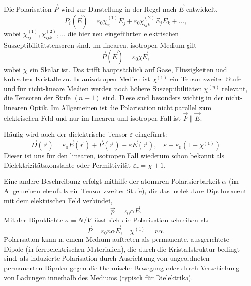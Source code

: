 Die Polarisation $\vec {P}$ wird zur Darstellung in der Regel nach $\vec {E}$ entwickelt,
\begin{equation*}
	P_{i}\left(\vec {E}\right)=\varepsilon _{0}\chi _{ij}^{\left(1\right)}E_{j}+\varepsilon _{0}\chi _{ijk}^{\left(2\right)}E_{j}E_{k}+\ldots ,
\end{equation*}
wobei $\chi _{ij}^{\left(1\right)}, \chi _{ijk}^{\left(2\right)},\ldots $ die hier neu eingeführten elektrischen Suszeptibilitätstensoren sind. Im linearen, isotropen Medium gilt
\begin{equation*}
	\vec {P}\left(\vec {E}\right)=\varepsilon _{0}\chi \vec {E},
\end{equation*}
wobei $\chi $ ein Skalar ist. Das trifft hauptsächlich auf Gase, Flüssigkeiten und kubischen Kristalle zu. In anisotropen Medien ist $\chi ^{\left(1\right)}$ ein Tensor zweiter Stufe und für nicht-lineare Medien werden noch höhere Suszeptibilitäten $\chi ^{\left(n\right)}$ relevant, die Tensoren der Stufe $\left(n+1\right)$ sind. Diese sind besonders wichtig in der nicht-linearen Optik. Im Allgemeinen ist die Polarisation nicht parallel zum elektrischen Feld und nur im linearen und isotropen Fall ist $\vec {P}\parallel \vec {E}$.

Häufig wird auch der dielektrische Tensor $\varepsilon $ eingeführt:
\begin{equation*}
	\vec {D}\left(\vec {r}\right)=\varepsilon _{0}\vec {E}\left(\vec {r}\right)+\vec {P}\left(\vec {r}\right)\equiv \varepsilon \vec {E}\left(\vec {r}\right), \quad\varepsilon \equiv \varepsilon _{0}\left(1+\chi ^{\left(1\right)}\right)
\end{equation*}
Dieser ist uns für den linearen, isotropen Fall wiederum schon bekannt als Dielektrizitätskonstante oder Permittivität $\varepsilon _{r}=\chi +1$.

Eine andere Beschreibung erfolgt mithilfe der atomaren Polarisierbarkeit $\alpha $ (im Allgemeinen ebenfalls ein Tensor zweiter Stufe), die das molekulare Dipolmoment mit dem elektrischen Feld verbindet,
\begin{equation*}
	\vec {p}=\varepsilon _{0}\alpha \vec {E}.
\end{equation*}
Mit der Dipoldichte $n=N/V$ lässt sich die Polarisation schreiben als
\begin{equation*}
	\vec {P}=\varepsilon _{0}n\alpha \vec {E}, \quad\chi ^{\left(1\right)}=n\alpha .
\end{equation*}
Polarisation kann in einem Medium auftreten als permanente, ausgerichtete Dipole (in ferroelektrischen Materialien), die durch die Kristallstruktur bedingt sind, als induzierte Polarisation durch Ausrichtung von ungeordneten permanenten Dipolen gegen die thermische Bewegung oder durch Verschiebung von Ladungen innerhalb des Mediums (typisch für Dielektrika).



